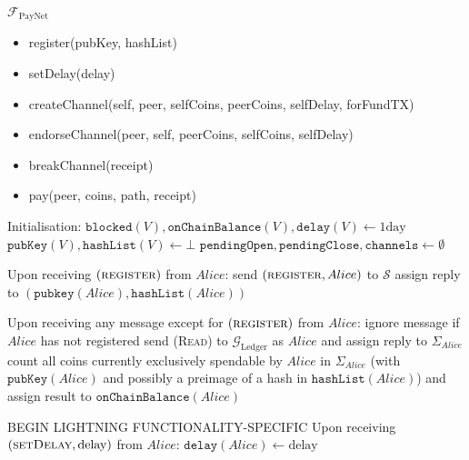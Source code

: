 \begin{functionality}{$\mathcal{F}_{\mathrm{PayNet}}$}
  \label{alg:payfunc}
    \begin{itemize}
      \item register(pubKey, hashList)
      \item setDelay(delay)
      \item createChannel(self, peer, selfCoins, peerCoins, selfDelay, forFundTX)
      \item endorseChannel(peer, self, peerCoins, selfCoins, selfDelay)
      \item breakChannel(receipt)
      \item pay(peer, coins, path, receipt)
    \end{itemize}

  \begin{algorithmic}[1]
    \State Initialisation:
      \Indent
        \State $\mathtt{blocked}\left(V\right),
        \mathtt{onChainBalance}\left(V\right), \mathtt{delay}\left(V\right)
        \gets 1\mathrm{day}$ 
        \State $\mathtt{pubKey}\left(V\right), \mathtt{hashList}\left(V\right)
        \gets \bot$
      \EndFor
      \State $\mathtt{pendingOpen}, \mathtt{pendingClose}, \mathtt{channels}
      \gets \emptyset$
      \EndIndent
    \State

    \State Upon receiving $\left(\textsc{register}\right)$ from $Alice$:
    \Indent
      \State send $\left(\textsc{register}, Alice\right)$ to $\mathcal{S}$
      \State assign reply to $\left(\mathtt{pubkey}\left(Alice\right),
      \mathtt{hashList}\left(Alice\right)\right)$
    \EndIndent
    \State

    \State Upon receiving any message except for
    $\left(\textsc{register}\right)$ from $Alice$:
    \Indent
      \State ignore message if $Alice$ has not registered
      \State send (\textsc{Read}) to $\mathcal{G}_{\mathrm{Ledger}}$ as $Alice$
      and assign reply to $\Sigma_{Alice}$
      \State count all coins currently exclusively spendable by $Alice$ in
      $\Sigma_{Alice}$ (with $\mathtt{pubKey}\left(Alice\right)$ and possibly a
      preimage of a hash in $\mathtt{hashList}\left(Alice\right)$) and assign
      result to $\mathtt{onChainBalance}\left(Alice\right)$ 
    \EndIndent
    \State

    \State BEGIN LIGHTNING FUNCTIONALITY-SPECIFIC
    \State Upon receiving $\left(\textsc{setDelay}, \mathrm{delay}\right)$
    from $Alice$:
    \Indent
      \State $\mathtt{delay}\left(Alice\right) \gets \mathrm{delay}$
    \EndIndent
    \State


\end{algorithmic}
\end{functionality}
